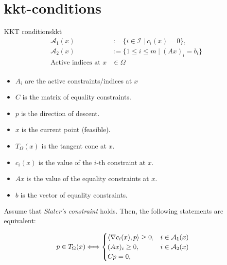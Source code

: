 \section[KKT-betingelser]{\gls{kkt-conditions}}

\begin{theorem}{KKT conditions}{kkt}
  \begin{align*}
    \mathcal{A}_1(x)            & := \{i \in \mathcal{I} \mid c_i(x) = 0\},                     \\
    \mathcal{A}_2(x)            & := \{1 \leq i \leq m \mid (Ax)_i = b_i\} \tag{Active indices} \\
    \text{Active indices at } x & \in \Omega                                                    \\
  \end{align*}

  \begin{itemize}
    \item \(A_i\) are the active constraints/indices at \(x\)
    \item \(C\) is the matrix of equality constraints.
    \item \(p\) is the direction of descent.
    \item \(x\) is the current point (feasible).
    \item \(T_{\Omega}(x)\) is the tangent cone at \(x\).
    \item \(c_i(x)\) is the value of the \(i\)-th constraint at \(x\).
    \item \(Ax\) is the value of the equality constraints at \(x\).
    \item \(b\) is the vector of equality constraints.
  \end{itemize}

  Assume that \emph{Slater's constraint} holds. Then, the following statements are equivalent:

  \begin{align*}
    p\in T_{\Omega}(x) & \Longleftrightarrow
    \begin{cases}
      \langle\nabla c_i(x), p\rangle \geq 0, & i \in \mathcal{A}_1(x) \\
      (Ax)_i \geq 0,                   & i \in \mathcal{A}_2(x) \\
      Cp = 0,                          &                        \\
    \end{cases}
  \end{align*}
\end{theorem}

